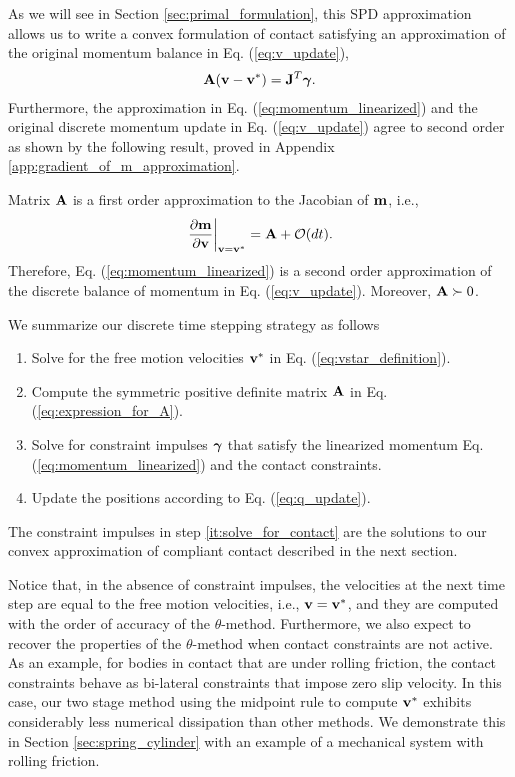 As we will see in Section \ref{sec:primal_formulation}, this SPD approximation
allows us to write a convex formulation of contact satisfying an approximation
of the original momentum balance in Eq. (\ref{eq:v_update}),
\begin{align}
	\mf{A}(\mf{v}-\mf{v}^*) = \mf{J}^T\mf{\bgamma}.
	\label{eq:momentum_linearized}
\end{align}
Furthermore, the approximation in Eq. (\ref{eq:momentum_linearized}) and the
original discrete momentum update in Eq. (\ref{eq:v_update}) agree to second
order as shown by the following result, proved in Appendix
\ref{app:gradient_of_m_approximation}.
\begin{prop}	
Matrix ${\mathbf{A}}$ is a first order approximation to the Jacobian of ${\mathbf{m}}$,
i.e.,
\begin{align}
	\left. \frac{\partial {\mathbf{m}}}{\partial {\mathbf{v}}} \right|_{{\mathbf{v}}={\mathbf{v}}^*} = {\mathbf{A}} + \mathcal{O}(dt).
\end{align}
Therefore, Eq. (\ref{eq:momentum_linearized}) is a second order approximation of
the discrete balance of momentum in Eq. (\ref{eq:v_update}). Moreover, ${\mathbf{A}}
\succ 0$.
\label{prop:gradient_of_m_approximation}
\end{prop}

We summarize our discrete time stepping strategy as follows
\begin{enumerate}
	\item Solve for the free motion velocities ${\mathbf{v}}^*$ in Eq.
	(\ref{eq:vstar_definition}).
	\item Compute the symmetric positive definite matrix ${\mathbf{A}}$ in Eq.
	(\ref{eq:expression_for_A}).
	\item\label{it:solve_for_contact} Solve for constraint impulses ${\bm\gamma}$
	that satisfy the linearized momentum Eq. (\ref{eq:momentum_linearized}) and
	the contact constraints. 
	\item Update the positions according to Eq. (\ref{eq:q_update}).
\end{enumerate}

The constraint impulses in step \ref{it:solve_for_contact} are the solutions to
our convex approximation of compliant contact described in the next section.

Notice that, in the absence of constraint impulses, the velocities at the next
time step are equal to the free motion velocities, i.e., ${\mathbf{v}}={\mathbf{v}}^*$, and
they are computed with the order of accuracy of the $\theta\text{-method}$.
Furthermore, we also expect to recover the properties of the
$\theta\text{-method}$ when contact constraints are not active. As an example,
for bodies in contact that are under rolling friction,
the contact constraints behave as bi-lateral constraints that impose zero slip
velocity. In this case, our two stage method using the midpoint rule to compute
${\mathbf{v}}^*$ exhibits considerably less numerical dissipation than other methods.
We demonstrate this in Section \ref{sec:spring_cylinder} with an example of a
mechanical system with rolling friction.


